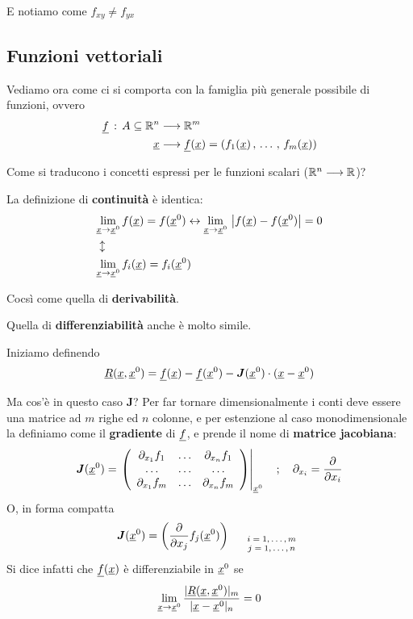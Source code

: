 E notiamo come $f_{xy}\neq f_{yx}$

\newpage

\subsection{Funzioni vettoriali}

Vediamo ora come ci si comporta con la famiglia più generale possibile di funzioni, ovvero
\begin{align}
	\underline{f} \, : \, A \subseteq \mathbb{R}^n {}&\longrightarrow \mathbb{R}^m\\
	\underline{x} &\longrightarrow \underline{f}(\underline{x})=(f_1(\underline{x}) \, , \, \dots \, , \, f_m(\underline{x})) \nonumber
\end{align}

Come si traducono i concetti espressi per le funzioni scalari ($\mathbb{R}^n\longrightarrow\mathbb{R}$)?

La definizione di \textbf{continuità} è identica:
\begin{align}
	{}&\underset{\underline{x} \rightarrow \underline{x}^0}{\lim} \, f(\underline{x})=f(\underline{x}^0) \leftrightarrow \underset{\underline{x} \rightarrow \underline{x}^0}{\lim} \, \left| f(\underline{x})-f(\underline{x}^0) \right|=0\\
	&\updownarrow \nonumber \\
	&\underset{\underline{x} \rightarrow \underline{x}^0}{\lim} \,f_i(\underline{x})=f_i(\underline{x}^0)
\end{align}

Cocsì come quella di \textbf{derivabilità}. 

Quella di \textbf{differenziabilità} anche è molto simile.

Iniziamo definendo
\begin{align}
	\underline{R}(\underline{x},\underline{x}^0)=\underline{f}(\underline{x}) - \underline{f}(\underline{x}^0) - \boldsymbol{J}(\underline{x}^0)\cdot (\underline{x} - \underline{x}^0)
\end{align}

Ma cos'è in questo caso $\boldsymbol{J}$? Per far tornare dimensionalmente i conti deve essere una matrice ad $m$ righe ed $n$ colonne, e per estenzione al caso monodimensionale la definiamo come il \textbf{gradiente} di $\underline{f}$, e prende il nome di \textbf{matrice jacobiana}:
\begin{align}
	\boldsymbol{J}(\vecx^0)= \left.\matrixThreeThree{\partial_{x_1}f_1}{\dots}{\partial_{x_n}f_1}{\dots}{\dots}{\dots}{\partial_{x_1}f_m}{\dots}{\partial_{x_n}f_m}\right|_{\vecx^0} \spacer \partial_{x_i}=\partialder{}{x_i}
\end{align}
O, in forma compatta
\begin{align}
	\boldsymbol{J}(\underline{x}^0)=\left( \frac{\partial }{\partial x_j} f_j(\underline{x}^0) \right)\scriptsize{_{\begin{array}{cc}
				{}&i=1,\dots,m\\
				&j=1,\dots,n
	\end{array}}}
\end{align}
Si dice infatti che $\underline{f}(\underline{x})$ è differenziabile in $\underline{x}^0$ se
\begin{align}
	\underset{\underline{x} \rightarrow \underline{x}^0}{\lim} \, \frac{|\underline{R}(\underline{x},\underline{x}^0)|_m}{|\underline{x} - \underline{x}^0|_n}=0
\end{align}

